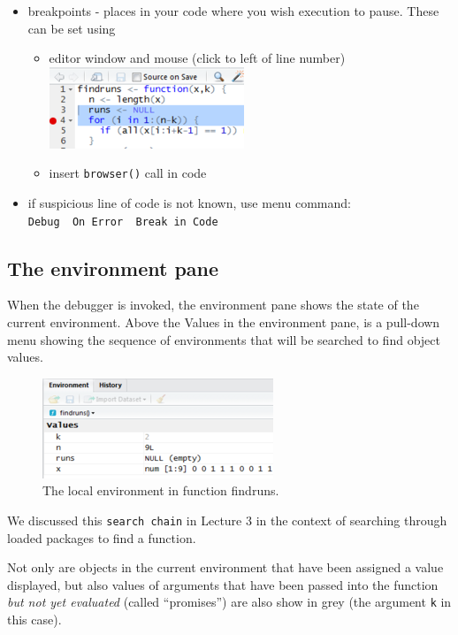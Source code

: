 \documentclass[]{article}
\providecommand{\tightlist}{%
  \setlength{\itemsep}{0pt}\setlength{\parskip}{0pt}}
\begin{document}
\begin{itemize}
\tightlist
\item
  breakpoints - places in your code where you wish execution to pause.
  These can be set using

  \begin{itemize}
  \tightlist
  \item
    editor window and mouse (click to left of line number)
    \includegraphics{screen1.png}
  \item
    insert \texttt{browser()} call in code
  \end{itemize}
\item
  if suspicious line of code is not known, use menu command:
  \texttt{Debug\ \textbar{}\ On\ Error\ \textbar{}\ Break\ in\ Code}
\end{itemize}

\subsection{The environment pane}\label{the-environment-pane}

When the debugger is invoked, the environment pane shows the state of
the current environment. Above the Values in the environment pane, is a
pull-down menu showing the sequence of environments that will be
searched to find object values.

\begin{figure}
\centering
\includegraphics{enviro.png}
\caption{The local environment in function findruns.}
\end{figure}

We discussed this \texttt{search\ chain} in Lecture 3 in the context of
searching through loaded packages to find a function.

Not only are objects in the current environment that have been assigned
a value displayed, but also values of arguments that have been passed
into the function \emph{but not yet evaluated} (called ``promises'') are
also show in grey (the argument \texttt{k} in this case).
\end{document}
